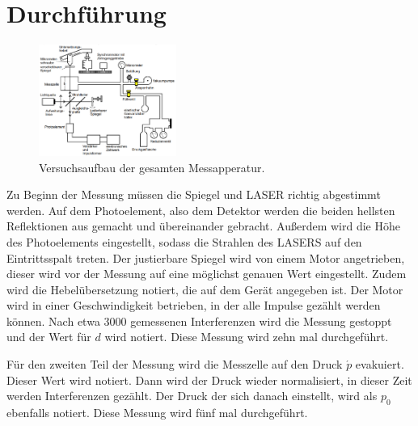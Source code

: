 \section{Durchführung}
\label{sec:Durchführung}


\begin{figure}
    \centering
    \includegraphics[width=0.4\textwidth]{images/bild4.png}
    \caption{Versuchsaufbau der gesamten Messapperatur.\cite{V401}}
    \label{fig:bild4}
\end{figure}

Zu Beginn der Messung müssen die Spiegel und LASER richtig abgestimmt werden. 
Auf dem Photoelement, also dem Detektor werden die beiden hellsten Reflektionen aus gemacht und übereinander gebracht.
Außerdem wird die Höhe des Photoelements eingestellt, sodass die Strahlen des LASERS auf den Eintrittsspalt treten.
Der justierbare Spiegel wird von einem Motor angetrieben, dieser wird vor der Messung auf eine möglichst genauen Wert eingestellt.
Zudem wird die Hebelübersetzung notiert, die auf dem Gerät angegeben ist. 
Der Motor wird in einer Geschwindigkeit betrieben, in der alle Impulse gezählt werden können. 
Nach etwa 3000 gemessenen Interferenzen wird die Messung gestoppt und der Wert für $d$ wird notiert. 
Diese Messung wird zehn mal durchgeführt.

Für den zweiten Teil der Messung wird die Messzelle auf den Druck $\acute{p}$ evakuiert. 
Dieser Wert wird notiert.
Dann wird der Druck wieder normalisiert, in dieser Zeit werden Interferenzen gezählt.
Der Druck der sich danach einstellt, wird als $p_0$ ebenfalls notiert.
Diese Messung wird fünf mal durchgeführt.